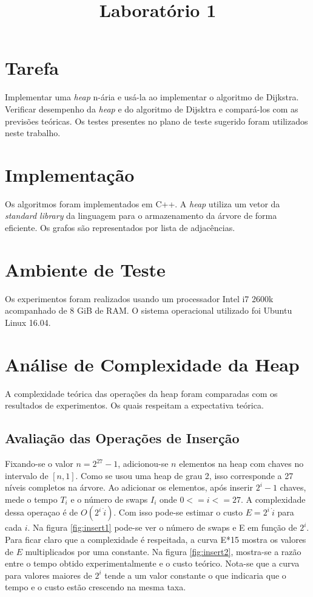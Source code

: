 \documentclass{iiufrgs}
\title{Laboratório 1}
\author{}{Thiago Bell}
\begin{document}
\maketitle

\setcounter{chapter}{1}

\section{Tarefa}
Implementar uma \textit{heap} n-ária e usá-la ao implementar o algoritmo de Dijkstra. Verificar desempenho da \textit{heap} e do algoritmo de Dijsktra e compará-los com as previs\~oes teóricas.
Os testes presentes no plano de teste sugerido foram utilizados neste trabalho.

\section{Implementaç\~ao}
Os algoritmos foram implementados em C++. A \textit{heap} utiliza um vetor da \textit{standard library} da linguagem para o armazenamento da árvore de forma eficiente. Os grafos s\~ao representados
por lista de adjacências.
\section{Ambiente de Teste}
Os experimentos foram realizados usando um processador Intel i7 2600k acompanhado de 8 GiB de RAM. O sistema operacional utilizado foi Ubuntu Linux 16.04.
\section{Análise de Complexidade da Heap}
A complexidade teórica das operaç\~oes da heap foram comparadas com os resultados de experimentos. Os quais respeitam a expectativa teórica. 
\subsection{Avaliaç\~ao das Operaç\~oes de Inserç\~ao}
Fixando-se o valor $n = 2^{27}-1$, adicionou-se $n$ elementos na heap com chaves no intervalo de $[n,1]$.  Como se usou uma heap de grau 2, isso corresponde a 27 níveis completos na árvore. 
Ao adicionar os elementos, após inserir $2^{i}-1$ chaves, mede o tempo $T_i$ e o número de swaps $I_i$ onde $0<=i<=27$. A complexidade dessa operaçao é de $O(2^i ~ \dot i)$.
Com isso pode-se estimar o custo $E = 2^i ~ \dot i$ para cada $i$. Na figura \ref{fig:insert1} pode-se ver o número de swaps e E em funç\~ao de $2^i$. 
Para ficar claro que a complexidade é respeitada, a curva E*15 mostra os valores de $E$ multiplicados por uma constante. Na figura \ref{fig:insert2}, 
mostra-se a raz\~ao entre o tempo obtido experimentalmente e o custo teórico. Nota-se que a curva para valores maiores de $2^i$ tende a um valor constante o que indicaria que o tempo e o custo est\~ao crescendo na mesma taxa.
\end{document}
